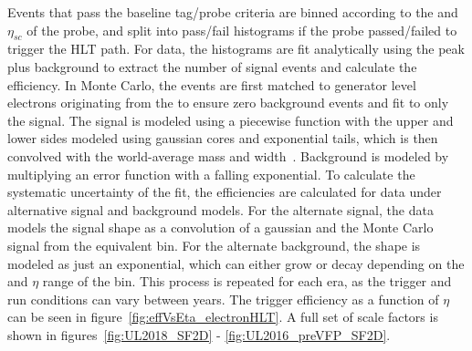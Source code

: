 Events that pass the baseline tag/probe criteria are binned according to the \pt and $\eta_{sc}$ of the probe, and split into pass/fail histograms if the probe passed/failed to trigger the HLT path. For data, the histograms are fit analytically using the \PZ peak plus background to extract the number of signal events and calculate the efficiency. In Monte Carlo, the events are first matched to generator level electrons originating from the \PZ to ensure zero background events and fit to only the \PZ signal. The signal is modeled using a piecewise function with the upper and lower sides modeled using gaussian cores and exponential tails, which is then convolved with the world-average \PZ mass and width~\cite{Sirunyan_2021}. Background is modeled by multiplying an error function with a falling exponential. To calculate the systematic uncertainty of the fit, the efficiencies are calculated for data under alternative signal and background models. For the alternate signal, the data models the signal shape as a convolution of a gaussian and the Monte Carlo signal from the equivalent bin. For the alternate background, the shape is modeled as just an exponential, which can either grow or decay depending on the \pt and $\eta$ range of the bin. This process is repeated for each era, as the trigger and run conditions can vary between years. The trigger efficiency as a function of $\eta$ can be seen in figure~\ref{fig:effVsEta_electronHLT}. A full set of scale factors is shown in figures~\ref{fig:UL2018_SF2D} - \ref{fig:UL2016_preVFP_SF2D}.

